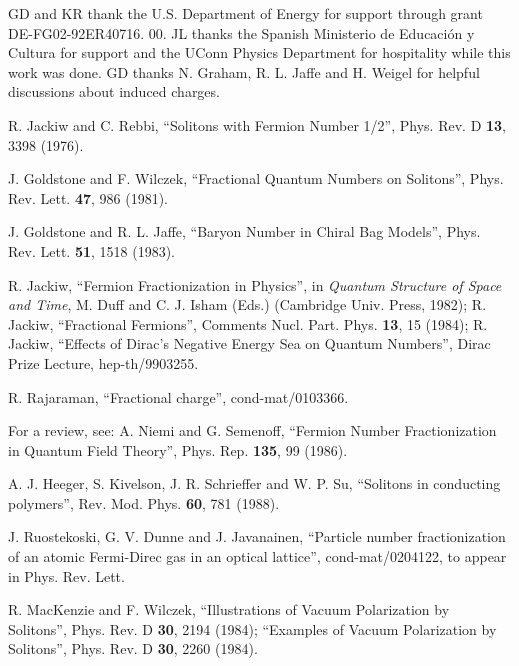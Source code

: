 \documentclass[a4paper,prd]{revtex4}
\begin{document}
\begin{acknowledgments}
GD and KR thank the U.S. Department of Energy for support through grant
DE-FG02-92ER40716. 00.  JL thanks the Spanish Ministerio de Educaci\'on y
Cultura for support and the UConn Physics Department for hospitality
while this work was done. GD thanks N. Graham, R. L. Jaffe and H. Weigel
for helpful discussions about induced charges.
\end{acknowledgments}


\begin{thebibliography}{99}

 R.  Jackiw and C.  Rebbi,  ``Solitons with Fermion Number 1/2'', 
Phys.  Rev.  D {\bf 13}, 3398 (1976). 

 J.  Goldstone and F.  Wilczek,  ``Fractional Quantum Numbers
on Solitons'',  Phys.  Rev.  Lett.  {\bf 47}, 986 (1981). 

 J.  Goldstone and R. L.  Jaffe,  ``Baryon Number in Chiral
Bag Models'',  Phys.  Rev.  Lett.  {\bf 51}, 1518 (1983). 

 R.  Jackiw,  ``Fermion Fractionization in Physics'',  
in {\it Quantum Structure of Space and Time},  M.  Duff and C. J.  Isham
(Eds.) (Cambridge Univ.  Press,  1982); R.  Jackiw, ``Fractional
Fermions'',  Comments Nucl.  Part.  Phys.  {\bf 13}, 15 (1984); R. 
Jackiw, ``Effects of Dirac's Negative Energy Sea on Quantum Numbers'',
Dirac Prize Lecture, hep-th/9903255.

 R. Rajaraman, ``Fractional charge'',
cond-mat/0103366. 

 For a review, see: A.  Niemi and G.  Semenoff, 
``Fermion Number Fractionization in Quantum Field Theory'',  Phys.  Rep. 
{\bf 135}, 99 (1986). 

 A. J.  Heeger,  S.  Kivelson,  J. R. Schrieffer and
W.  P.  Su,  ``Solitons in conducting polymers'',  Rev.  Mod.  Phys. 
{\bf 60}, 781 (1988). 

 J. Ruostekoski, G. V. Dunne and J. Javanainen, ``Particle
number fractionization of an atomic Fermi-Direc gas in an optical
lattice'', cond-mat/0204122, to appear in Phys. Rev. Lett.

 R.  MacKenzie and F.  Wilczek,  ``Illustrations of Vacuum 
Polarization by Solitons'',  Phys.  Rev.  D {\bf 30}, 2194 (1984);
``Examples of Vacuum Polarization by Solitons'',  Phys.  Rev.  D {\bf
30}, 2260 (1984). 


\end{thebibliography}
\end{document}
